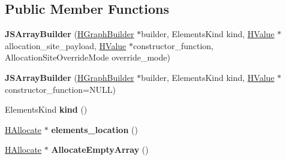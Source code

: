 \subsection*{Public Member Functions}
\begin{DoxyCompactItemize}
\item 
{\bfseries J\+S\+Array\+Builder} (\hyperlink{classv8_1_1internal_1_1_h_graph_builder}{H\+Graph\+Builder} $\ast$builder, Elements\+Kind kind, \hyperlink{classv8_1_1internal_1_1_h_value}{H\+Value} $\ast$allocation\+\_\+site\+\_\+payload, \hyperlink{classv8_1_1internal_1_1_h_value}{H\+Value} $\ast$constructor\+\_\+function, Allocation\+Site\+Override\+Mode override\+\_\+mode)\hypertarget{classv8_1_1internal_1_1_h_graph_builder_1_1_j_s_array_builder_a0abb07b5b6ed3fb8458bd92404f773bf}{}\label{classv8_1_1internal_1_1_h_graph_builder_1_1_j_s_array_builder_a0abb07b5b6ed3fb8458bd92404f773bf}

\item 
{\bfseries J\+S\+Array\+Builder} (\hyperlink{classv8_1_1internal_1_1_h_graph_builder}{H\+Graph\+Builder} $\ast$builder, Elements\+Kind kind, \hyperlink{classv8_1_1internal_1_1_h_value}{H\+Value} $\ast$constructor\+\_\+function=N\+U\+LL)\hypertarget{classv8_1_1internal_1_1_h_graph_builder_1_1_j_s_array_builder_a132fbf17ebcf77abda75cababdcaa95d}{}\label{classv8_1_1internal_1_1_h_graph_builder_1_1_j_s_array_builder_a132fbf17ebcf77abda75cababdcaa95d}

\item 
Elements\+Kind {\bfseries kind} ()\hypertarget{classv8_1_1internal_1_1_h_graph_builder_1_1_j_s_array_builder_ad64ba52cdb985fccd6359effcc3b1f0c}{}\label{classv8_1_1internal_1_1_h_graph_builder_1_1_j_s_array_builder_ad64ba52cdb985fccd6359effcc3b1f0c}

\item 
\hyperlink{classv8_1_1internal_1_1_h_allocate}{H\+Allocate} $\ast$ {\bfseries elements\+\_\+location} ()\hypertarget{classv8_1_1internal_1_1_h_graph_builder_1_1_j_s_array_builder_a22c3af71579a469f34bd4f3af3ffe655}{}\label{classv8_1_1internal_1_1_h_graph_builder_1_1_j_s_array_builder_a22c3af71579a469f34bd4f3af3ffe655}

\item 
\hyperlink{classv8_1_1internal_1_1_h_allocate}{H\+Allocate} $\ast$ {\bfseries Allocate\+Empty\+Array} ()\hypertarget{classv8_1_1internal_1_1_h_graph_builder_1_1_j_s_array_builder_ada934d05557c970bf911726ca64c99e4}{}\label{classv8_1_1internal_1_1_h_graph_builder_1_1_j_s_array_builder_ada934d05557c970bf911726ca64c99e4}


\end{DoxyCompactItemize}
